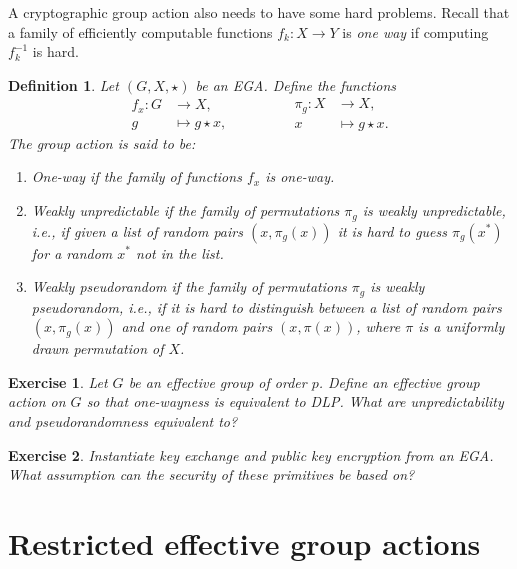 \documentclass{article}
\newtheorem{ex}{Exercise}
\newtheorem{defi}{Definition}
\begin{document}
A cryptographic group action also needs to have some hard
problems. Recall that a family of efficiently computable functions
$f_k:X\to Y$ is \emph{one way} if computing $f_k^{-1}$ is hard.

\begin{defi}
  Let $(G,X, \star )$ be an EGA.  Define the functions
  \begin{equation*}
    \begin{aligned}
      f_x : G &\to X,\\
      g &\mapsto g\star x,
    \end{aligned}
    \qquad\qquad
    \begin{aligned}
      \pi_g : X &\to X,\\
      x &\mapsto g\star x.
    \end{aligned}
  \end{equation*}
  The group action is said to be:
  \begin{enumerate}
  \item \emph{One-way} if the family of functions $f_x$ is one-way.
  \item \emph{Weakly unpredictable} if the family of permutations
    $\pi_g$ is weakly unpredictable, i.e., if given a list of random
    pairs $(x,\pi_g(x))$ it is hard to guess $\pi_g(x^*)$ for a random
    $x^*$ not in the list.
  \item \emph{Weakly pseudorandom} if the family of permutations
    $\pi_g$ is weakly pseudorandom, i.e., if it is hard to distinguish
    between a list of random pairs $(x,\pi_g(x))$ and one of random
    pairs $(x,\pi(x))$, where $\pi$ is a uniformly drawn permutation
    of $X$.
  \end{enumerate}
\end{defi}

\begin{ex}
  Let $G$ be an effective group of order $p$.  Define an effective
  group action on $G$ so that one-wayness is equivalent to DLP.  What
  are unpredictability and pseudorandomness equivalent to?
\end{ex}

\begin{ex}
  \label{ex:dh}
  Instantiate key exchange and public key encryption from an EGA.
  What assumption can the security of these primitives be based on?
\end{ex}


\section{Restricted effective group actions}
\end{document}
